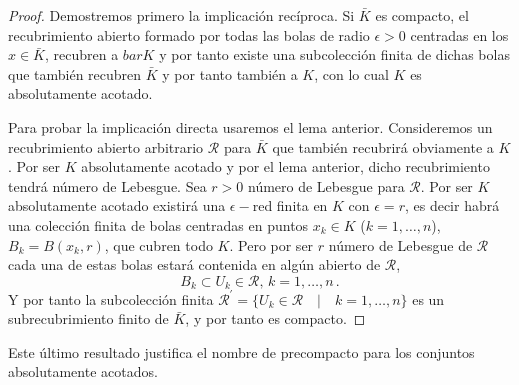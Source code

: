 \documentclass[12pt]{book}
\begin{document}
\begin{proof}
Demostremos primero la implicación recíproca. Si $\bar{K}$  es compacto, el recubrimiento abierto 
formado por todas las bolas de radio $\epsilon>0$ centradas en los $x\in \bar{K}$, recubren a 
$bar{K}$ y por tanto existe una subcolección finita de dichas bolas que también recubren $\bar{K}$ 
y por tanto también a $K$, con lo cual $K$ es absolutamente acotado.

Para probar la implicación directa usaremos el lema anterior. Consideremos un recubrimiento 
abierto  arbitrario $\mathcal{R}$ para $\bar{K}$ que también recubrirá obviamente a $K$. Por ser 
$K$ absolutamente acotado y por el lema anterior, dicho recubrimiento  tendrá número de 
Lebesgue. Sea $r>0$ número de Lebesgue para $\mathcal{R}$. Por ser $K$ absolutamente 
acotado existirá una $\epsilon-$red finita en $K$ con $\epsilon=r$, es decir habrá una colección 
finita  de bolas centradas en puntos $x_k\in K$ ($k=1,\dots,n$), $B_k=B(x_k,r)$, que cubren todo 
$K$.  Pero por ser $r$ número de  Lebesgue de $\mathcal{R}$ cada una de estas bolas estará 
contenida  en algún abierto  de $\mathcal{R}$,
$$B_k\subset U_k\in \mathcal{R},\, k=1,\dots,n\,.$$
Y por tanto la subcolección finita $\mathcal{R}^\prime=\{U_k\in\mathcal{R}\quad|\quad  k=1,\dots, 
n\}$ es un subrecubrimiento finito de $\bar{K}$,  y por tanto es compacto.
\end{proof}

Este último resultado justifica el nombre de precompacto para los conjuntos absolutamente 
acotados.
\end{document}
